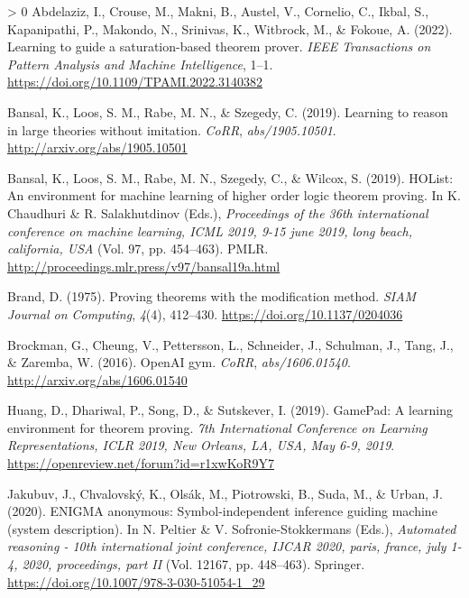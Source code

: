 \documentclass[10pt,a4paper,onecolumn]{article}
\newlength{\cslhangindent}
\newenvironment{CSLReferences}[3] %
 {%
  \setlength{\parindent}{0pt}
  \ifodd #1 \everypar{\setlength{\hangindent}{\cslhangindent}}\ignorespaces\fi
  \ifnum #2 > 0
  \setlength{\parskip}{#2\baselineskip}
  \fi
 }%
 {}
\begin{document}
\hypertarget{refs}{}
\begin{CSLReferences}{1}{0}
\leavevmode\hypertarget{ref-9669114}{}%
Abdelaziz, I., Crouse, M., Makni, B., Austel, V., Cornelio, C., Ikbal,
S., Kapanipathi, P., Makondo, N., Srinivas, K., Witbrock, M., \& Fokoue,
A. (2022). Learning to guide a saturation-based theorem prover.
\emph{IEEE Transactions on Pattern Analysis and Machine Intelligence},
1--1. \url{https://doi.org/10.1109/TPAMI.2022.3140382}

\leavevmode\hypertarget{ref-DBLP:journalsux2fcorrux2fabs-1905-10501}{}%
Bansal, K., Loos, S. M., Rabe, M. N., \& Szegedy, C. (2019). Learning to
reason in large theories without imitation. \emph{CoRR},
\emph{abs/1905.10501}. \url{http://arxiv.org/abs/1905.10501}

\leavevmode\hypertarget{ref-DBLP:confux2ficmlux2fBansalLRSW19}{}%
Bansal, K., Loos, S. M., Rabe, M. N., Szegedy, C., \& Wilcox, S. (2019).
HOList: An environment for machine learning of higher order logic
theorem proving. In K. Chaudhuri \& R. Salakhutdinov (Eds.),
\emph{Proceedings of the 36th international conference on machine
learning, {ICML} 2019, 9-15 june 2019, long beach, california, {USA}}
(Vol. 97, pp. 454--463). {PMLR}.
\url{http://proceedings.mlr.press/v97/bansal19a.html}

\leavevmode\hypertarget{ref-doi:10.1137ux2f0204036}{}%
Brand, D. (1975). Proving theorems with the modification method.
\emph{SIAM Journal on Computing}, \emph{4}(4), 412--430.
\url{https://doi.org/10.1137/0204036}

\leavevmode\hypertarget{ref-DBLP:journalsux2fcorrux2fBrockmanCPSSTZ16}{}%
Brockman, G., Cheung, V., Pettersson, L., Schneider, J., Schulman, J.,
Tang, J., \& Zaremba, W. (2016). OpenAI gym. \emph{CoRR},
\emph{abs/1606.01540}. \url{http://arxiv.org/abs/1606.01540}

\leavevmode\hypertarget{ref-DBLP:confux2ficlrux2fHuangDSS19}{}%
Huang, D., Dhariwal, P., Song, D., \& Sutskever, I. (2019). GamePad: {A}
learning environment for theorem proving. \emph{7th International
Conference on Learning Representations, {ICLR} 2019, New Orleans, LA,
USA, May 6-9, 2019}. \url{https://openreview.net/forum?id=r1xwKoR9Y7}

\leavevmode\hypertarget{ref-DBLP:confux2fcadeux2fJakubuvCOP0U20}{}%
Jakubuv, J., Chvalovský, K., Olsák, M., Piotrowski, B., Suda, M., \&
Urban, J. (2020). {ENIGMA} anonymous: Symbol-independent inference
guiding machine (system description). In N. Peltier \& V.
Sofronie-Stokkermans (Eds.), \emph{Automated reasoning - 10th
international joint conference, {IJCAR} 2020, paris, france, july 1-4,
2020, proceedings, part {II}} (Vol. 12167, pp. 448--463). Springer.
\url{https://doi.org/10.1007/978-3-030-51054-1_29}


\end{CSLReferences}
\end{document}
